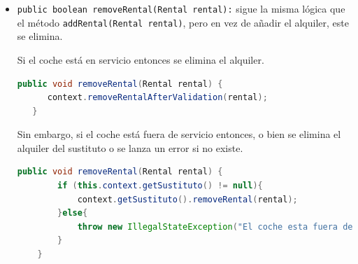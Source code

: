 \begin{itemize}
    Si un coche \textbf{está en servicio}, entonces añadimos el nuevo alquiler verificando que es no se solapa con ninguno de los otros asociados al coche. 
  
  \begin{lstlisting}[style = javaNormal, language=Java]
        public void addRental(Rental rental) {
      context.validateAndAddRental(rental);
   }
   // Metodo de la clase Car
   protected void validateAndAddRental(Rental rental) { //Metodo que solo llama el estado, por lo que estamos delegandole la decision
        assert rental != null : "Rental no puede ser null";
        assert !esSustituto() : "El coche esta siendo usado como sustituto";
        for (Rental existingRental : rentals) {
            assert !datesOverlap(existingRental.getStartDate(), existingRental.getEndDate(),
                rental.getStartDate(), rental.getEndDate()) : "El alquiler se solapa con otro ya existente.";
        }
        rentals.add(rental);
    }
   
    \end{lstlisting} 

      Si estuviera \textbf{fuera de servicio}, entonces añadimos el nuevo alquiler al sustituto, si existe, o lanzamos una excepción.
      
    \begin{lstlisting}[style = javaNormal, language=Java]
         public void addRental(Rental rental) {
        if (this.context.getSustituto() != null) {
            context.getSustituto().addRental(rental);
        } else {
            throw new IllegalStateException("El coche esta fuera de servicio y no tiene sustituto");
        }
    }   
    \end{lstlisting}    
    \item \texttt{public boolean removeRental(Rental rental):} sigue la misma lógica que el método \texttt{addRental(Rental rental)}, pero en vez de añadir
    el alquiler, este se elimina.

    Si el coche está en servicio entonces se elimina el alquiler.
    \begin{lstlisting}[style = javaNormal, language=Java]
          public void removeRental(Rental rental) {
      context.removeRentalAfterValidation(rental);
   }
    \end{lstlisting}

    Sin embargo, si el coche está fuera de servicio entonces, o bien se elimina el alquiler del sustituto o se lanza un error si no existe.
    \begin{lstlisting}[style = javaNormal, language=Java]
       public void removeRental(Rental rental) {
        if (this.context.getSustituto() != null){
            context.getSustituto().removeRental(rental);
        }else{
            throw new IllegalStateException("El coche esta fuera de servicio y no tiene sustituto");
        }
    }
    \end{lstlisting}
    
    
\end{itemize}


